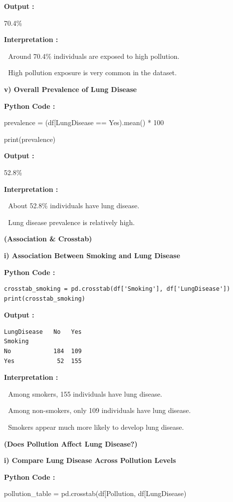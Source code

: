 \documentclass[
]{article}
\begin{document}
\textbf{Output :}

70.4\%

\textbf{Interpretation :}

 Around 70.4\% individuals are exposed to high pollution.

 High pollution exposure is very common in the dataset.

\textbf{v) Overall Prevalence of Lung Disease}

\textbf{Python Code :}

prevalence = (df{[}\textquotesingle LungDisease\textquotesingle{]} ==
\textquotesingle Yes\textquotesingle).mean() * 100

print(prevalence)

\textbf{Output :}

52.8\%

\textbf{Interpretation :}

 About 52.8\% individuals have lung disease.

 Lung disease prevalence is relatively high.

\textbf{(Association \& Crosstab)}

\textbf{i) Association Between Smoking and Lung Disease}

\textbf{Python Code :}

\begin{verbatim}
crosstab_smoking = pd.crosstab(df['Smoking'], df['LungDisease'])
print(crosstab_smoking)
\end{verbatim}

\textbf{Output :}

\begin{verbatim}
LungDisease   No   Yes
Smoking
No            184  109
Yes            52  155
\end{verbatim}

\textbf{Interpretation :}

 Among smokers, 155 individuals have lung disease.

 Among non-smokers, only 109 individuals have lung disease.

 Smokers appear much more likely to develop lung disease.

\textbf{(Does Pollution Affect Lung Disease?)}

\textbf{i) Compare Lung Disease Across Pollution Levels}

\textbf{Python Code :}

pollution\_table =
pd.crosstab(df{[}\textquotesingle Pollution\textquotesingle{]},
df{[}\textquotesingle LungDisease\textquotesingle{]})
\end{document}
